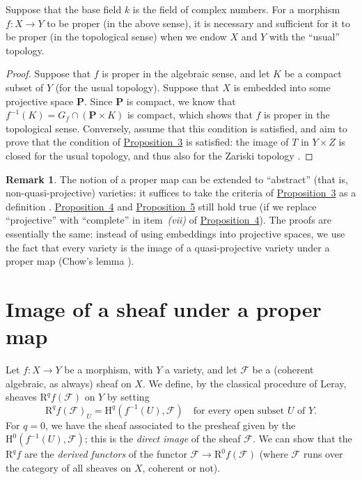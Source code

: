 \documentclass{article}
\theoremstyle{plain}
\newenvironment{proposition}[1]
    {\renewcommand\theinnerproposition{#1}\innerproposition}
    {\endinnerproposition}
\theoremstyle{definition}
\newtheorem*{remark}{Remark}
\newcommand{\scr}[1]{{\mathscr{#1}}}
\newcommand{\HH}{\mathrm{H}}
\newcommand{\RR}{\mathrm{R}}
\newcommand{\PP}{\mathbf{P}}
\newcommand{\oldpage}[1]{\marginpar{\footnotesize$\Big\vert$ \textit{p.~#1}}}
\begin{document}
\begin{proposition}{5}
\label{proposition5}
  Suppose that the base field $k$ is the field of complex numbers.
  For a morphism $f\colon X\to Y$ to be proper (in the above sense), it is necessary and sufficient for it to be proper (in the topological sense) when we endow $X$ and $Y$ with the ``usual'' topology.
\end{proposition}

\begin{proof}
  Suppose that $f$ is proper in the algebraic sense, and let $K$ be a compact subset of $Y$ (for the usual topology).
  Suppose that $X$ is embedded into some projective space $\PP$.
  Since $\PP$ is compact, we know that $f^{-1}(K)=G_f\cap(\PP\times K)$ is compact, which shows that $f$ is proper in the topological sense.
  Conversely, assume that this condition is satisfied, and aim to prove that the condition of \hyperref[proposition3]{Proposition~3} is satisfied:
\oldpage{102}
  the image of $T$ in $Y\times Z$ is closed for the usual topology, and thus also for the Zariski topology \cite[proposition~7, p.~12]{13}.
\end{proof}

\begin{remark}
  The notion of a proper map can be extended to ``abstract'' (that is, non-quasi-projective) varieties:
  it suffices to take the criteria of \hyperref[proposition3]{Proposition~3} as a definition \cite{4}.
  \hyperref[proposition4]{Proposition~4} and \hyperref[proposition5]{Proposition~5} still hold true (if we replace ``projective'' with ``complete'' in item~\emph{(vii)} of \hyperref[proposition4]{Proposition~4}).
  The proofs are essentially the same:
  instead of using embeddings into projective spaces, we use the fact that every variety is the image of a quasi-projective variety under a proper map (Chow's lemma \cite{4,14}).
\end{remark}


\section{Image of a sheaf under a proper map}
\label{section3}

Let $f\colon X\to Y$ be a morphism, with $Y$ a variety, and let $\scr{F}$ be a (coherent algebraic, as always) sheaf on $X$.
We define, by the classical procedure of Leray, sheaves $\RR^qf(\scr{F})$ on $Y$ by setting
\[
  \RR^qf(\scr{F})_U = \HH^q(f^{-1}(U),\scr{F})
  \quad\mbox{for every open subset $U$ of $Y$.}
\]
For $q=0$, we have the sheaf associated to the presheaf given by the $\HH^0(f^{-1}(U),\scr{F})$;
this is the \emph{direct image} of the sheaf $\scr{F}$.
We can show \cite{7} that the $\RR^qf$ are the \emph{derived functors} of the functor $\scr{F}\to\RR^0f(\scr{F})$ (where $\scr{F}$ runs over the category of all sheaves on $X$, coherent or not).
\end{document}
